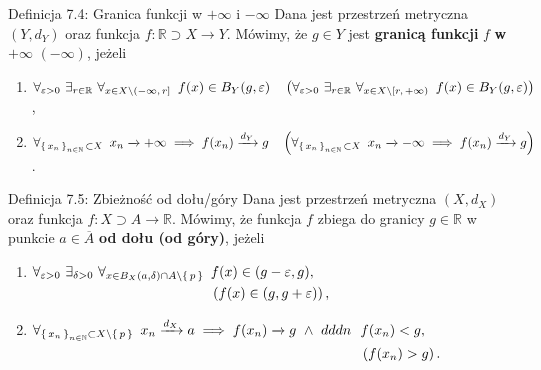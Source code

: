 \documentclass{article}
\newcommand{\hquad}{\mkern9mu}
\newcommand{\R}{\mathbb{R}}
\newcommand{\N}{\mathbb{N}}
\newcommand{\arr}[1]{\xrightarrow{#1}}
\newcommand*\closure[1]{\overline{#1}}
\newcommand{\seq}[1]{\set{#1_n}_{n\in\N}}
\begin{document}
\begin{defr}{Definicja 7.4: Granica funkcji w $\boldsymbol{+\infty}$ i $\boldsymbol{-\infty}$}
Dana jest przestrzeń metryczna $(Y, d_Y)$ oraz funkcja $f:\R\supset X\to Y$. Mówimy, że $g\in Y$ jest \textbf{granicą funkcji}
$f$ \textbf{w} $\boldsymbol{+\infty}$ $\boldsymbol{(-\infty)}$, jeżeli
\begin{enumerate}
    \item[(C)] $\forall_{\varepsilon>0}\ \exists_{r\in\R}\ \forall_{x\in X\setminus(-\infty,\, r]}\hquad f(x)\in B_Y(g,\varepsilon)
    \quad \left(\forall_{\varepsilon>0}\ \exists_{r\in\R}\ \forall_{x\in X\setminus[r,\, +\infty)}\hquad f(x)\in B_Y(g,\varepsilon)\right)$,
    \item[(H)] $\forall_{\seq{x}\,\subset X}\hquad x_n\arr{}+\infty\implies f(x_n)\arr{d_Y}g\quad
    \left(\forall_{\seq{x}\,\subset X}\hquad x_n\arr{}-\infty\implies f(x_n)\arr{d_Y}g\right)$.
\end{enumerate}
\end{defr}

\begin{defr}{Definicja 7.5: Zbieżność od dołu/góry}
Dana jest przestrzeń metryczna $(X,d_X)$ oraz funkcja $f:X\supset A\to\R$. Mówimy, że funkcja $f$ zbiega do granicy $g\in\R$
w punkcie $a\in\closure{A}$ \textbf{od dołu (od góry)}, jeżeli
    \begin{enumerate}
        \item[(C)] $\begin{aligned}[t]
        \forall_{\varepsilon>0}\ \exists_{\delta>0}\ \forall_{x\in B_X(a, \delta)\cap A\setminus\set{p}}\hquad& f(x)\in(g-\varepsilon,g),\\
        &\left(f(x)\in(g,g+\varepsilon)\right),
        \end{aligned}$ 
        \item[(H)] $\begin{aligned}[t]
        \forall_{\seq{x}\subset X\setminus\set{p}}\hquad x_n\arr{d_X}a\implies f(x_n)\arr{}g\ \land\ dddn\ \ &f(x_n)<g,\\
        &\left(f(x_n)>g\right).
        \end{aligned}$
    \end{enumerate}
\end{defr}
\end{document}
